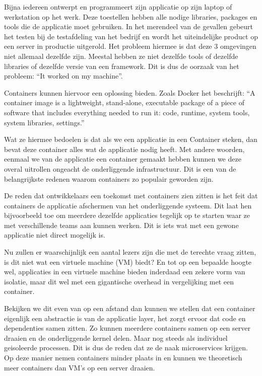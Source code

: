 Bijna iedereen ontwerpt en programmeert zijn applicatie op zijn laptop of werkstation op het werk. Deze toestellen hebben alle nodige libraries, packages en tools die de applicatie moet gebruiken. In het merendeel van de gevallen gebeurt het testen bij de testafdeling van het bedrijf en wordt het uiteindelijke product op een server in productie uitgerold. Het probleem hiermee is dat deze 3 omgevingen niet allemaal dezelfde zijn. Meestal hebben ze niet dezelfde tools of dezelfde libraries of dezelfde versie van een framework. Dit is dus de oorzaak van het probleem: “It worked on my machine”.

Containers kunnen hiervoor een oplossing bieden. Zoals Docker het beschrijft: “A container image is a lightweight, stand-alone, executable package of a piece of software that includes everything needed to run it: code, runtime, system tools, system libraries, settings.”

Wat ze hiermee bedoelen is dat als we een applicatie in een Container steken, dan bevat deze container alles wat de applicatie nodig heeft. Met andere woorden, eenmaal we van de applicatie een container gemaakt hebben kunnen we deze overal uitrollen ongeacht de onderliggende infrastructuur. Dit is een van de belangrijkste redenen waarom containers zo populair geworden zijn.

De reden dat ontwikkelaars een toekomst met containers zien zitten is het feit dat containers de applicatie afschermen van het onderliggende systeem. Dit laat hen bijvoorbeeld toe om meerdere dezelfde applicaties tegelijk op te starten waar ze met verschillende teams aan kunnen werken. Dit is iets wat met een gewone applicatie niet direct mogelijk is.

Nu zullen er waarschijnlijk een aantal lezers zijn die met de terechte vraag zitten, is dit niet wat een virtuele machine (VM) biedt? En tot op een bepaalde hoogte wel, applicaties in een virtuele machine bieden inderdaad een zekere vorm van isolatie, maar dit wel met een gigantische overhead in vergelijking met een container. 

Bekijken we dit even van op een afstand dan kunnen we stellen dat een container eigenlijk een abstractie is van de applicatie layer, het zorgt ervoor dat code en dependenties samen zitten. Zo kunnen meerdere containers samen op een server draaien en de onderliggende kernel delen. Maar nog steeds als individuel geisoleerde processen. Dit is dus de reden dat ze de naak microservices krijgen. Op deze manier nemen containers minder plaats in en kunnen we theoretisch meer containers dan VM’s op een server draaien.

